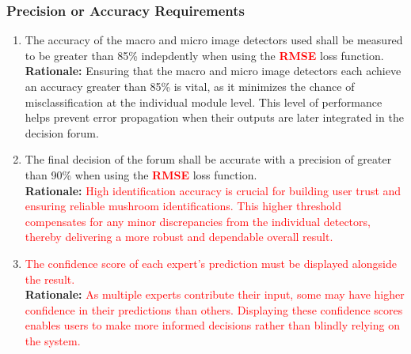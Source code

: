 \documentclass{article}
\begin{document}
\subsubsection{Precision or Accuracy Requirements}
\label{ssub:precision_or_accuracy_requirements}
\begin{enumerate}[{PR-PA}1. ]
	\item The accuracy of the macro and micro image detectors used shall be measured to be greater than 85\% indepdently when using the \textcolor{red}{\textbf{RMSE}} loss function.\\
	\textbf{Rationale:} Ensuring that the macro and micro image detectors each achieve an accuracy greater than 85\% is vital, as it minimizes the chance of misclassification at the individual module level. This level of performance helps prevent error propagation when their outputs are later integrated in the decision forum.
	\item The final decision of the forum shall be accurate with a precision of greater than 90\% when using the \textcolor{red}{\textbf{RMSE}} loss function.\\
	\textbf{Rationale:} \textcolor{red}{High identification accuracy is crucial for building user trust and ensuring reliable mushroom identifications. This higher threshold compensates for any minor discrepancies from the individual detectors, thereby delivering a more robust and dependable overall result.}
	\item \textcolor{red}{The confidence score of each expert's prediction must be displayed alongside the result.}\\
	\textbf{Rationale:} \textcolor{red}{As multiple experts contribute their input, some may have higher confidence in their predictions than others. Displaying these confidence scores enables users to make more informed decisions rather than blindly relying on the system.}\\
\end{enumerate}
\end{document}
